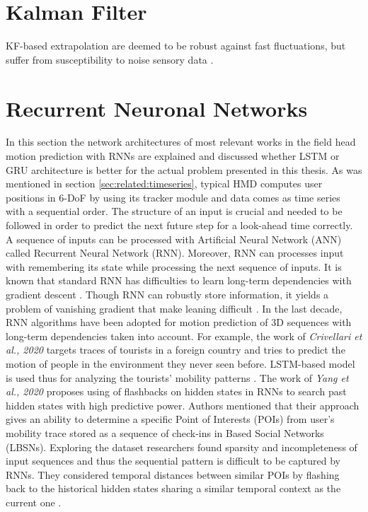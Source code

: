 \section{Kalman Filter}

\label{sec:related:kalman}

KF-based extrapolation are deemed to be robust against fast fluctuations, but suffer from susceptibility to noise sensory data \cite{delay_compensation_360}.

\section{Recurrent Neuronal Networks}
\label{sec:related:deep}
In this section the network architectures of most relevant works in the field head motion prediction with RNNs are explained and discussed whether LSTM or GRU architecture is better for the actual problem presented in this thesis. As was mentioned in section \ref{sec:related:timeseries}, typical HMD computes user positions in 6-DoF by using its tracker module and data comes as time series with a sequential order. The structure of an input is crucial and needed to be followed in order to predict the next future step for a look-ahead time correctly. A sequence of inputs can be processed with Artificial Neural Network (ANN) called Recurrent Neural Network (RNN). Moreover, RNN can processes input with remembering its state while processing the next sequence of inputs. It is known that standard RNN has difficulties to learn long-term dependencies with gradient descent \cite{rnn_difficults}. Though RNN can robustly store information, it yields a problem of vanishing gradient that make leaning difficult \cite{rnn_difficults}. In the last decade, RNN algorithms have been adopted for motion prediction of 3D sequences with long-term dependencies taken into account. For example, the work of \textit{Crivellari et al., 2020} targets traces of tourists in a foreign country and tries to predict the motion of people in the environment they never seen before. LSTM-based model is used thus for analyzing the tourists’ mobility patterns \cite{tourist_traces}. The work of \textit{Yang et al., 2020} proposes using of flashbacks on hidden states in RNNs to search past hidden states with high predictive power. Authors mentioned that their approach gives an ability to determine a specific Point of Interests (POIs) from user’s mobility trace stored as a sequence of check-ins in Based Social Networks (LBSNs). Exploring the dataset researchers found sparsity and incompleteness of input sequences and thus the sequential pattern is difficult to be captured by RNNs. They considered temporal distances between similar POIs by flashing back to the historical hidden states sharing a similar temporal context as the current one \cite{rnn_traces_hidden}. \\

